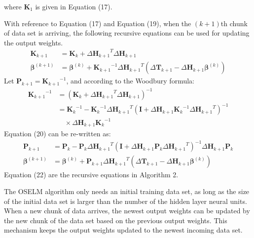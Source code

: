 \documentclass[a4paper, 14pt]{extarticle}
\begin{document}
\newline
where \(\mathbf{K}_1\) is given in Equation (17).
\newline
\par With reference to Equation (17) and Equation (19), when the \((k+1)\)th chunk of data set is arriving, the following recursive equations can be used for updating the output weights.
\begin{equation}
\begin{split}
    \mathbf{K}_{k+1}&=\mathbf{K}_{k}+{\Delta\mathbf{H}_{k+1}}^T\Delta\mathbf{H}_{k+1}\\
    \mathbf{\beta}^{(k+1)}&=\mathbf{\beta}^{(k)}+{\mathbf{K}_{k+1}}^{-1}{\Delta\mathbf{H}_{k+1}}^T(\Delta\mathbf{T}_{k+1}-\Delta\mathbf{H}_{k+1}{\mathbf{\beta}}^{(k)})
\end{split}
\end{equation}
\newline
Let \(\mathbf{P}_{k+1} = {\mathbf{K}_{k+1}}^{-1}\), and according to the Woodbury formula\cite{GoluVanl96}:
\newline
\begin{equation}
    \begin{split}
        {\mathbf{K}_{k+1}}^{-1} &= (\mathbf{K}_{k}+{\Delta\mathbf{H}_{k+1}}^T\Delta\mathbf{H}_{k+1})^{-1}
        \\&={\mathbf{K}_{k}}^{-1}-{\mathbf{K}_{k}}^{-1}{\Delta\mathbf{H}_{k+1}}^T(\mathbf{I}+\Delta\mathbf{H}_{k+1}{\mathbf{K}_{k}}^{-1}{\Delta\mathbf{H}_{k+1}}^T)^{-1}\\& \quad \times\Delta\mathbf{H}_{k+1}{\mathbf{K}_{k}}^{-1}
    \end{split}
\end{equation}
\newline
Equation (20) can be re-written as:
\newline
\begin{equation}
\begin{split}
  \mathbf{P}_{k+1} &= \mathbf{P}_k-\mathbf{P}_k{\Delta\mathbf{H}_{k+1}}^T(\mathbf{I}+\Delta\mathbf{H}_{k+1}\mathbf{P}_k{\Delta\mathbf{H}_{k+1}}^T)^{-1}\Delta\mathbf{H}_{k+1}\mathbf{P}_k \\
\mathbf{\beta}^{(k+1)} &= \mathbf{\beta}^{(k)}+\mathbf{P}_{k+1}{\Delta\mathbf{H}_{k+1}}^T(\Delta\mathbf{T}_{k+1}-\Delta\mathbf{H}_{k+1}\mathbf{\beta}^{(k)})  
\end{split}
\end{equation}
\newline
Equation (22)\cite{liang2006fast} are the recursive equations in Algorithm 2. 
\newline
\par The OSELM algorithm only needs an initial training data set, as long as the size of the initial data set is larger than the number of the hidden layer neural units. When a new chunk of data arrives, the newest output weights can be updated by the new chunk of the data set based on the previous output weights. This mechanism keeps the output weights updated to the newest incoming data set. 
\end{document}
